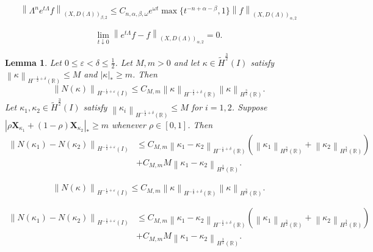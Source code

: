 \documentclass[10pt,a4paper]{amsart}
\newtheorem{lemma}{Lemma}
\newcommand{\R}{\mathbb{R}}
\newcommand{\abs}[1]{\left\lvert #1 \right\rvert}
\newcommand{\bm}[1]{\boldsymbol{#1}}
\newcommand{\hi}[1]{H^{#1}(I)}
\newcommand{\hr}[1]{H^{#1}(\R)}
\newcommand{\norm}[1]{\left\lVert #1 \right\rVert}
\newcommand{\paren}[1]{\left(#1\right)}
\newcommand{\thi}[1]{\wt H^{#1}(I)}
\newcommand{\wt}[1]{\widetilde{#1}}
\newcommand{\xka}[1]{\bm X_{\kappa_{#1}}}
\begin{document}
\begin{equation}
    \norm{\Lambda^n e^{t\Lambda}f}_{(X,D(\Lambda))_{\beta,2}}
    \le C_{n,\alpha,\beta,\omega}e^{\omega t}
    \max\{t^{-n+\alpha-\beta},1\}
    \norm{f}_{(X,D(\Lambda))_{\alpha,2}}
\end{equation}

\begin{equation}
    \lim_{t\downarrow0}
    \norm{e^{t\Lambda}f-f}_{(X,D(\Lambda))_{\alpha,2}}=0.
\end{equation}

\begin{lemma}\label{lem:N-est}
Let $0 \le \varepsilon < \delta \le \frac{1}{2}$.
Let $M,m>0$ and let $\kappa\in\thi{\frac{3}{2}}$ satisfy
$\norm{\kappa}_{\hr{-\frac12+\delta}}\le M$ and $\abs{\kappa}_*\ge m$. Then
\begin{equation}\label{eqn:N-pointwise-bound}
    \norm{N(\kappa)}_{\hi{-\frac{1}{2}+\varepsilon}}
    \le C_{M,m}
    \norm{\kappa}_{\hr{-\frac{1}{2}+\delta}}
    \norm{\kappa}_{\hr{\frac{3}{2}}} .
\end{equation}
Let $\kappa_1,\kappa_2\in\thi{\frac{3}{2}}$ satisfy
$\norm{\kappa_i}_{\hr{-\frac{1}{2}+\delta}}\le M$ for $i=1,2$. Suppose
$\abs{\rho\xka{1}+\paren{1-\rho}\xka{2}}_*\ge m$ whenever
$\rho\in[0,1]$.
Then
\begin{equation}\label{eqn:N-pointwise-difference}
\begin{aligned}
    \norm{N(\kappa_1) - N(\kappa_2)}_{\hi{-\frac{1}{2}+\varepsilon}} &\le C_{M,m} \norm{\kappa_1-\kappa_2}_{\hr{-\frac{1}{2}+\delta}} \paren{\norm{\kappa_1}_{\hr{\frac{3}{2}}}+\norm{\kappa_2}_{\hr{\frac{3}{2}}}} \\
    & + C_{M,m}M \norm{\kappa_1-\kappa_2}_{\hr{\frac{3}{2}}}.
\end{aligned}
\end{equation}
\end{lemma}

\begin{equation}
    \norm{N(\kappa)}_{\hi{-\frac{1}{2}+\varepsilon}}
    \le C_{M,m}
    \norm{\kappa}_{\hr{-\frac{1}{2}+\delta}}
    \norm{\kappa}_{\hr{\frac{3}{2}}} .
\end{equation}

\begin{equation}
\begin{aligned}
    \norm{N(\kappa_1) - N(\kappa_2)}_{\hi{-\frac{1}{2}+\varepsilon}} &\le C_{M,m} \norm{\kappa_1-\kappa_2}_{\hr{-\frac{1}{2}+\delta}} \paren{\norm{\kappa_1}_{\hr{\frac{3}{2}}}+\norm{\kappa_2}_{\hr{\frac{3}{2}}}} \\
    & + C_{M,m}M \norm{\kappa_1-\kappa_2}_{\hr{\frac{3}{2}}}.
\end{aligned}
\end{equation}
\end{document}

